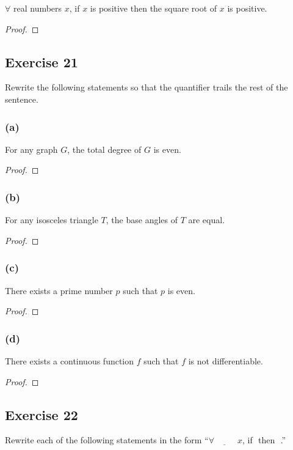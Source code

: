 \documentclass[14pt]{extarticle}
\newcommand{\fbl}{\underline{\hspace{1cm}}\,\,}
\newcommand{\fa}{\forall}
\begin{document}
$\fa$ real numbers $x$, if $x$ is positive then the square root of $x$ is positive.

\begin{proof}

\end{proof}

\subsection{Exercise 21}
Rewrite the following statements so that the quantifier trails the rest of the sentence.

\subsubsection{(a)}
For any graph $G$, the total degree of $G$ is even.

\begin{proof}

\end{proof}

\subsubsection{(b)}
For any isosceles triangle $T$, the base angles of $T$ are equal.

\begin{proof}

\end{proof}

\subsubsection{(c)}
There exists a prime number $p$ such that $p$ is even.

\begin{proof}

\end{proof}

\subsubsection{(d)}
There exists a continuous function $f$ such that $f$ is not differentiable.

\begin{proof}

\end{proof}

\subsection{Exercise 22}
Rewrite each of the following statements in the
form “$\fa \fbl x$, if \fbl then \fbl.”
\end{document}
